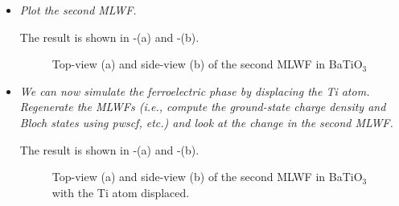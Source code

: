 \begin{itemize}
	\item {\it Plot the second MLWF.}

	The result is shown in -(a) and -(b). 
	\begin{figure}[h!]
	\centering
	\centering
	\caption{Top-view (a) and side-view (b) of the second MLWF in BaTiO$_3$ }\label{fig9.1}
	\end{figure}


	\item {\it We can now simulate the ferroelectric phase by displacing the Ti atom. Regenerate the MLWFs (i.e., compute the ground-state charge density and Bloch states using pwscf, etc.) and look at the change in the second MLWF.}
	
	The result is shown in -(a) and -(b).
	\begin{figure}[h!]
	\centering
	\centering
	\caption{Top-view (a) and side-view (b) of the second MLWF in BaTiO$_3$ with the Ti atom displaced.}\label{fig9.2}
	\end{figure}
\end{itemize}

